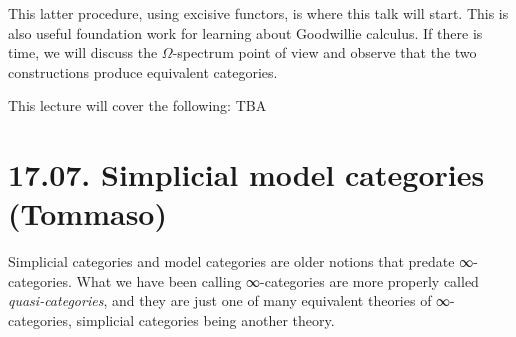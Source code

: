 \documentclass[a4paper]{amsart}
\numberwithin{figure}{section}
\theoremstyle{theorem}
\theoremstyle{definition}
\newcommand{\ZZ}{\mathbb{Z}}
\begin{document}
This latter procedure, using excisive functors, is where this talk will start. This is also useful foundation work for learning about Goodwillie calculus. If there is time, we will discuss the $\Omega$-spectrum point of view and observe that the two constructions produce equivalent categories.


This lecture will cover the following: TBA

%
%
%
%
%
%
%
%
%
%
%

\section{17.07. Simplicial model categories (Tommaso)}

Simplicial categories and model categories are older notions that predate ∞-categories. What we have been calling ∞-categories are more properly called \emph{quasi-categories}, and they are just one of many equivalent theories of ∞-categories, simplicial categories being another theory. 
\end{document}
